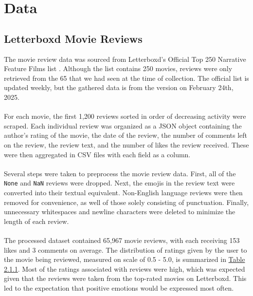 \documentclass[11pt]{article}
\begin{document}
\section{Data}
\subsection{Letterboxd Movie Reviews}
The movie review data was sourced from Letterboxd's Official Top 250 Narrative Feature Films list \cite{Vis}. Although the list contains 250 movies, reviews were only retrieved from the 65 that we had seen at the time of collection. The official list is updated weekly, but the gathered data is from the version on February 24th, 2025. \\ \\
For each movie, the first 1,200 reviews sorted in order of decreasing activity were scraped. Each individual review was organized as a JSON object containing the author's rating of the movie, the date of the review, the number of comments left on the review, the review text, and the number of likes the review received. These were then aggregated in CSV files with each field as a column. \\ \\
Several steps were taken to preprocess the movie review data. First, all of the \texttt{None} and \texttt{NaN} reviews were dropped. Next, the emojis in the review text were converted into their textual equivalent. Non-English language reviews were then removed for convenience, as well of those solely consisting of punctuation. Finally, unnecessary whitespaces and newline characters were deleted to minimize the length of each review. \\ \\
The processed dataset contained 65,967 movie reviews, with each receiving 153 likes and 3 comments on average. The distribution of ratings given by the user to the movie being reviewed, measured on scale of 0.5 - 5.0, is summarized in \hyperref[tab:review_rating_distribution]{Table 2.1.1}. Most of the ratings associated with reviews were high, which was expected given that the reviews were taken from the top-rated movies on Letterboxd. This led to the expectation that positive emotions would be expressed most often.
\renewcommand{\thetable}{2.1.1}
\end{document}
